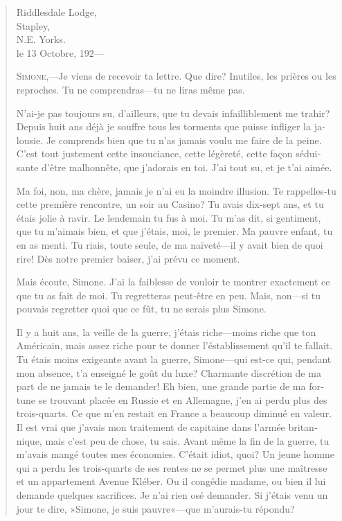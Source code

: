 \begin{quotation}
\begin{french}

\begin{flushright}
Riddlesdale Lodge,\\
Stapley,\\
N.E. Yorks.\\
le 13 Octobre, 192—
\end{flushright}

\textsc{Simone},—Je viens de recevoir ta lettre. Que dire? Inutiles, les prières ou les reproches. Tu ne comprendras—tu ne liras même pas.

N'ai-je pas toujours su, d'ailleurs, que tu devais infailliblement me
trahir? Depuis huit ans déjà je souffre tous les torments que puisse
infliger la jalousie. Je comprends bien que tu n'as jamais voulu me
faire de la peine. C'est tout justement cette insouciance, cette
légèreté, cette façon séduisante d'être malhonnête, que j'adorais en
toi. J'ai tout su, et je t'ai aimée.

Ma foi, non, ma chère, jamais je n'ai eu la moindre illusion. Te
rappelles-tu cette première rencontre, un soir au Casino? Tu avais
dix-sept ans, et tu étais jolie à ravir. Le lendemain tu fus à moi. Tu
m'as dit, si gentiment, que tu m'aimais bien, et que j'étais, moi, le
premier. Ma pauvre enfant, tu en as menti. Tu riais, toute seule, de
ma naïveté—il y avait bien de quoi rire! Dès notre premier baiser,
j'ai prévu ce moment.

Mais écoute, Simone. J'ai la faiblesse de vouloir te montrer
exactement ce que tu as fait de moi. Tu regretteras peut-être en peu.
Mais, non—si tu pouvais regretter quoi que ce fût, tu ne serais plus
Simone.

Il y a huit ans, la veille de la guerre, j'étais riche—moins riche
que ton Américain, mais assez riche pour te donner l'éstablissement
qu'il te fallait. Tu étais moins exigeante avant la guerre,
Simone—qui est-ce qui, pendant mon absence, t'a enseigné le goût du
luxe? Charmante discrétion de ma part de ne jamais te le demander! Eh
bien, une grande partie de ma fortune se trouvant placée en Russie et
en Allemagne, j'en ai perdu plus des trois-quarts. Ce que m'en restait
en France a beaucoup diminué en valeur. Il est vrai que j'avais mon
traitement de capitaine dans l'armée britannique, mais c'est peu de
chose, tu sais. Avant même la fin de la guerre, tu m'avais mangé
toutes mes économies. C'était idiot, quoi? Un jeune homme qui a perdu
les trois-quarts de ses rentes ne se permet plus une maîtresse et
un appartement Avenue Kléber. Ou il congédie madame, ou bien il lui
demande quelques sacrifices. Je n'ai rien osé demander. Si j'étais
venu un jour te dire, »Simone, je suis pauvre«—que m'aurais-tu
répondu?


\end{french}
\end{quotation}
